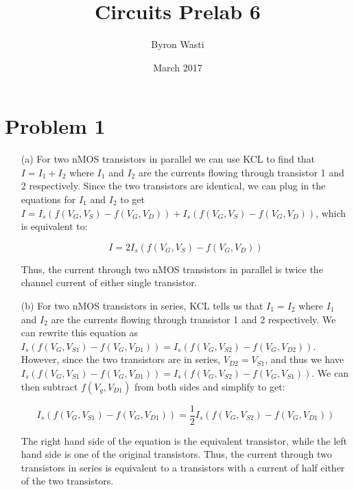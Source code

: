 \documentclass{article}
\title{Circuits Prelab 6}
\author{Byron Wasti}
\date{March 2017}
\begin{document}
\maketitle

\section{Problem 1}
\begin{itemize}
    \item[(a)]
        For two nMOS transistors in parallel we can use KCL to find that $I = I_1 + I_2$ where $I_1$ and $I_2$ are the currents flowing through transistor 1 and 2 respectively. Since the two transistors are identical, we can plug in the equations for $I_1$ and $I_2$ to get $I = I_s(f(V_G,V_S) - f(V_G,V_D)) + I_s(f(V_G,V_S) - f(V_G,V_D))$, which is equivalent to:
        
        \begin{equation}
            I = 2I_s(f(V_G,V_S) - f(V_G,V_D))
        \end{equation}

        Thus, the current through two nMOS transistors in parallel is twice the channel current of either single transistor.

    \item[(b)] 
        For two nMOS transistors in series, KCL tells us that $I_1 = I_2$ where $I_1$ and $I_2$ are the currents flowing through transistor 1 and 2 respectively. We can rewrite this equation as $I_s(f(V_G,V_{S1}) - f(V_G,V_{D1})) = I_s(f(V_G,V_{S2}) - f(V_G,V_{D2}))$. However, since the two transistors are in series, $V_{D2} = V_{S1}$, and thus we have $I_s(f(V_G,V_{S1}) - f(V_G,V_{D1})) = I_s(f(V_G,V_{S2}) - f(V_G,V_{S1}))$. We can then subtract $f(V_g, V_{D1})$ from both sides and simplify to get:

        \begin{equation}
            I_s(f(V_G, V_{S1}) - f(V_G,V_{D1})) = \frac{1}{2}I_s(f(V_G, V_{S2}) - f(V_G,V_{D1}))
        \end{equation}

        The right hand side of the equation is the equivalent transistor, while the left hand side is one of the original transistors. Thus, the current through two transistors in series is equivalent to a transistors with a current of half either of the two transistors.

\end{itemize}
\end{document}
